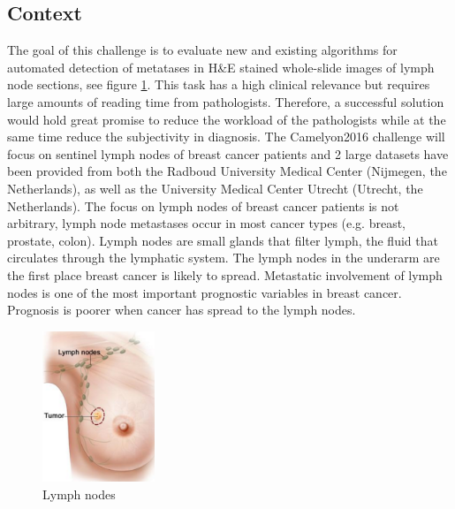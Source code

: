 \documentclass[a4paper,10pt]{article}
\begin{document}
\subsection{Context}
The goal of this challenge is to evaluate new and existing algorithms for automated detection of metatases in H\&E stained whole-slide images of lymph node sections, see figure \ref{LymphNode}. This task has a high clinical relevance but requires large amounts of reading time from pathologists. Therefore, a successful solution would hold great promise to reduce the workload of the pathologists while at the same time reduce the subjectivity in diagnosis. The Camelyon2016 challenge will focus on sentinel lymph nodes of breast cancer patients and 2 large datasets have been provided from both the Radboud University Medical Center (Nijmegen, the Netherlands), as well as the University Medical Center Utrecht (Utrecht, the Netherlands). The focus on lymph nodes of breast cancer patients is not arbitrary, lymph node metastases occur in most cancer types (e.g. breast, prostate, colon). Lymph nodes are small glands that filter lymph, the fluid that circulates through the lymphatic system. The lymph nodes in the underarm are the first place breast cancer is likely to spread. Metastatic involvement of lymph nodes is one of the most important prognostic variables in breast cancer. Prognosis is poorer when cancer has spread to the lymph nodes.

\begin{figure}[!ht]
\centering
\includegraphics[width=0.3\textwidth]{Booby.png}
\caption{Lymph nodes}
\label{LymphNode}
\end{figure}
\end{document}
